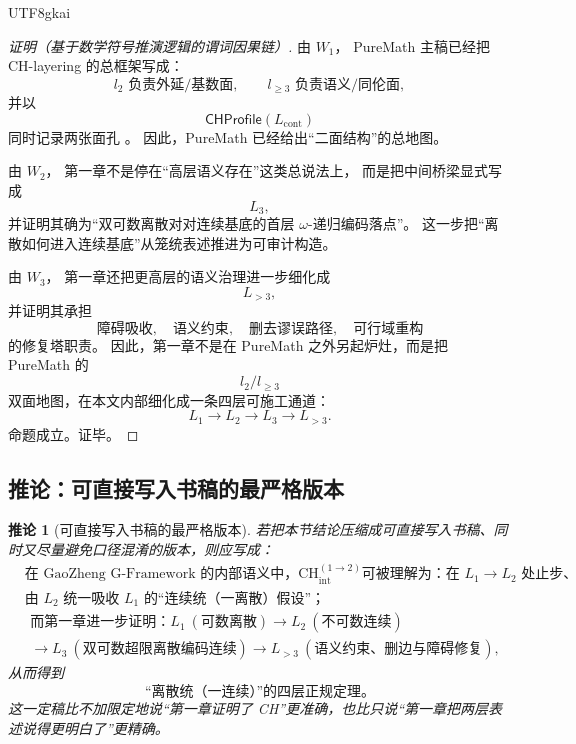 \documentclass[12pt]{article}
\newtheorem{corollary}{推论}[section]
\newcommand{\CHint}{\mathrm{CH}_{\mathrm{int}}}
\newcommand{\CHProfileOp}{\mathsf{CHProfile}}
\begin{document}
\begin{CJK*}{UTF8}{gkai}
\begin{proof}[证明（基于数学符号推演逻辑的谓词因果链）]
由 $W_1$，
PureMath 主稿已经把 CH-layering 的总框架写成：
\[
  l_2\text{ 负责外延/基数面},
  \qquad
  l_{\ge3}\text{ 负责语义/同伦面},
\]
并以
\[
  \CHProfileOp(L_{\mathrm{cont}})
\]
同时记录两张面孔
\cite{GaoZheng2025GFramework,GaoZhengAppVol1,RepoAppMathVol4Tex}。
因此，PureMath 已经给出“二面结构”的总地图。

由 $W_2$，
第一章不是停在“高层语义存在”这类总说法上，
而是把中间桥梁显式写成
\[
  L_3,
\]
并证明其确为“双可数离散对对连续基底的首层 $\omega$-递归编码落点”。
这一步把“离散如何进入连续基底”从笼统表述推进为可审计构造。

由 $W_3$，
第一章还把更高层的语义治理进一步细化成
\[
  L_{>3},
\]
并证明其承担
\[
  \text{障碍吸收},\quad
  \text{语义约束},\quad
  \text{删去谬误路径},\quad
  \text{可行域重构}
\]
的修复塔职责。
因此，第一章不是在 PureMath 之外另起炉灶，而是把 PureMath 的
\[
  l_2/l_{\ge3}
\]
双面地图，在本文内部细化成一条四层可施工通道：
\[
  L_1\to L_2\to L_3\to L_{>3}.
\]
命题成立。证毕。
\end{proof}

\subsection{推论：可直接写入书稿的最严格版本}
\label{subsec:tex41-ch-confirmation-corollary}

\begin{corollary}[可直接写入书稿的最严格版本]
\label{cor:tex41-ch-confirmation-final}
若把本节结论压缩成可直接写入书稿、同时又尽量避免口径混淆的版本，则应写成：
\[
\boxed{
\begin{aligned}
  &\text{在 GaoZheng G-Framework 的内部语义中，}
  \CHint^{(1\to2)}
  \text{可被理解为：在 }L_1\to L_2\text{ 处止步、}\\
  &\text{由 }L_2\text{ 统一吸收 }L_1\text{ 的“连续统（一离散）假设”；}
\end{aligned}
}
\]
\[
\boxed{
\begin{aligned}
  &\text{而第一章进一步证明：}
  L_1\ (\text{可数离散})
  \to
  L_2\ (\text{不可数连续})\\
  &\to
  L_3\ (\text{双可数超限离散编码连续})
  \to
  L_{>3}\ (\text{语义约束、删边与障碍修复}),
\end{aligned}
}
\]
从而得到
\[
\boxed{
  \text{“离散统（一连续）”的四层正规定理。}
}
\]
这一定稿比不加限定地说“第一章证明了 CH”更准确，也比只说“第一章把两层表述说得更明白了”更精确。
\end{corollary}


\end{CJK*}
\end{document}
